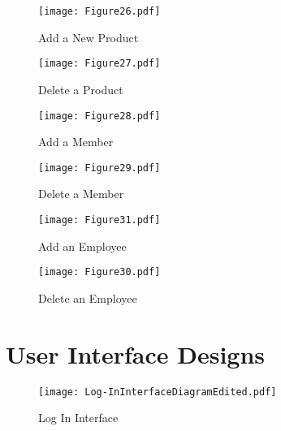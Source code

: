 \begin{landscape}
\begin{figure}[H]
\caption{Add a New Product} \label{fig:Add a New Product}
\hfill\texttt{[image: Figure26.pdf]}\hspace*{\fill}
\end{figure}
\pagebreak

\begin{figure}[H]
\caption{Delete a Product} \label{fig:Delete a Product}
\hfill\texttt{[image: Figure27.pdf]}\hspace*{\fill}
\end{figure}
\pagebreak

\begin{figure}[H]
\caption{Add a Member} \label{fig:Add a Member}
\hfill\texttt{[image: Figure28.pdf]}\hspace*{\fill}
\end{figure}
\pagebreak

\begin{figure}[H]
\caption{Delete a Member} \label{fig:Delete a Member}
\hfill\texttt{[image: Figure29.pdf]}\hspace*{\fill}
\end{figure}
\pagebreak

\begin{figure}[H]
\caption{Add an Employee} \label{fig:Add an Employee}
\hfill\texttt{[image: Figure31.pdf]}\hspace*{\fill}
\end{figure}
\pagebreak

\begin{figure}[H]
\caption{Delete an Employee} \label{fig:Delete an Employee}
\hfill\texttt{[image: Figure30.pdf]}\hspace*{\fill}
\end{figure}
\pagebreak

\end{landscape}
\section{User Interface Designs}


\begin{figure}[H]
\caption{Log In Interface} \label{fig: Log In Interface}
\hfill\texttt{[image: Log-InInterfaceDiagramEdited.pdf]}\hspace*{\fill}
\end{figure}


